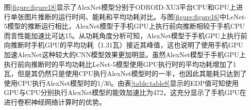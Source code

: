 \begin{table}[htbp]
  \centering
  \caption{AlexNet模型结构中的卷积层和全连接层}
  \label{table:table7}
\end{table}

图\ref{figure:figure18}显示了AlexNet模型分别于ODROID-XU3平台CPU和GPU上进行单张图片推断的运行时间、能耗和平均功耗对比。与图\ref{figure:figure16}中LeNet-5模型的推断运行相比，AlexNet模型于手机GPU上执行前向推断相较于手机CPU而言性能加速比可达15。从功耗角度分析可知，AlexNet模型于手机GPU上执行前向推断时手机GPU的平均功耗（1.31瓦）接近其峰值，这也说明了使用手机GPU加速AlexNet这种较大的CNN模型效果更加明显。虽然AlexNet模型于手机GPU上执行前向推断时的平均功耗比LeNet-5模型使用GPU执行时的平均功耗增加了1瓦，但是其仍然只是使用CPU执行AlexNet模型时的一半，也因此其能耗只达到了使用CPU执行AlexNet模型时的1/30。由表\ref{table:table8}显示的EDP值可知使用GPU与CPU分别执行AlexNet模型的能效加速比为472，这充分显示了手机GPU在进行卷积神经网络计算时的优势。

